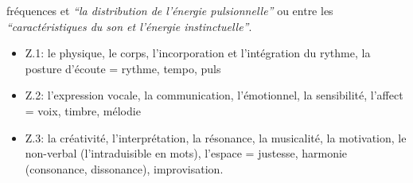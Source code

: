 fréquences et \textit {``la distribution de l'énergie pulsionnelle''} ou entre
les
\textit{``caractéristiques du son et l'énergie
	instinctuelle''}\autocite[ch. 13]{auriol:cle}.
\begin{itemize}
	\item  Z.1: le physique, le corps, l'incorporation et
	l'intégration du rythme,
	la posture d'écoute  =  rythme, tempo, puls
	\item  Z.2:  l'expression vocale, la communication,
	l'émotionnel, la sensibilité, l'affect = voix, timbre, mélodie
	\item Z.3: la créativité, l'interprétation, la
	résonance, la musicalité, la motivation, le non-verbal (l'intraduisible en mots), l'espace = justesse, 
	harmonie (consonance,
	dissonance), improvisation.
\end{itemize}

